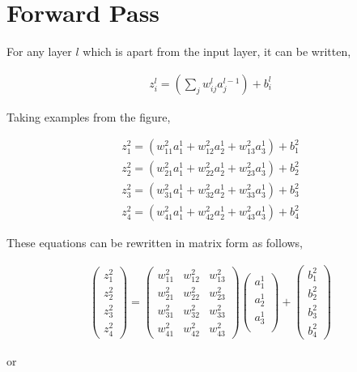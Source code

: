 \documentclass[11pt, a4paper]{article}
\begin{document}
\section{Forward Pass}

For any layer $l$ which is apart from the input layer, it can be written,

\begin{align*}
	z^l_i = \left( \sum_j w^l_{ij}a^{l-1}_j \right)  + b^l_i 
\end{align*} 

Taking examples from the figure,

\begin{align*}
	z^2_1 = (w^2_{11}a^1_1  + w^2_{12}a^1_2  +  w^2_{13}a^1_3) + b^2_1 \\ 
	z^2_2 = (w^2_{21}a^1_1  + w^2_{22}a^1_2  +  w^2_{23}a^1_3) + b^2_2 \\
	z^2_3 = (w^2_{31}a^1_1  + w^2_{32}a^1_2  +  w^2_{33}a^1_3) + b^2_3 \\
	z^2_4 = (w^2_{41}a^1_1  + w^2_{42}a^1_2  +  w^2_{43}a^1_3) + b^2_4 
\end{align*}

These equations can be rewritten in matrix form as follows,

\begin{align*}
	\begin{pmatrix} z^2_1 \\ z^2_2 \\ z^2_3 \\z^2_4 \end{pmatrix} = \begin{pmatrix}  w^2_{11} & w^2_{12} & w^2_{13} \\ w^2_{21} & w^2_{22} & w^2_{23} \\ w^2_{31} & w^2_{32} & w^2_{33} \\w^2_{41} & w^2_{42} & w^2_{43}  \end{pmatrix} \begin{pmatrix} a^1_1 \\ a^1_2 \\ a^1_3 \\ \end{pmatrix} + \begin{pmatrix} b^2_1 \\ b^2_2 \\ b^2_3 \\b^2_4 \end{pmatrix}	
\end{align*}

or 
\end{document}
